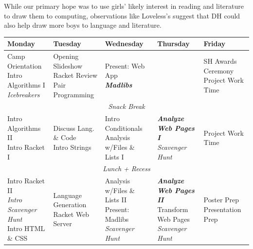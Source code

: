 While our primary hope was to use girls' likely interest in reading
and literature to draw them to computing, observations like Loveless's
suggest that DH could also help draw more boys to language and
literature.


\newcommand{\afk}[1]{\textit{#1}}
\newcommand{\proj}[1]{\textit{\textbf{#1}}}
\renewcommand\cellalign{lt}

\begin{table}[t]
\begin{tabular}{|l|l|l|l|l|}
\hline
\textbf{Monday} 	& \textbf{Tuesday} 	& \textbf{Wednesday} 	& \textbf{Thursday} 		& \textbf{Friday} \\ \hline \hline

\makecell{Camp Orientation \\ Intro Algorithms I \\ \afk{Icebreakers}}
	& \makecell{Opening Slideshow \\ Racket Review \\ Pair Programming} 
	& \makecell{Present: Web App \\ \proj{Madlibs}}
	& \makecell{RegExp}
	& \makecell{SH Awards Ceremony \\ Project Work Time}
	\\ \hline

\multicolumn{5}{|c|}{\afk{Snack Break}}
	\\ \hline

\makecell{Intro Algorithms II \\ Intro Racket I}
	& \makecell{Discuss Lang. \& Code \\ Intro Strings}
	& \makecell{Intro Conditionals \\ Analysis w/Files \& Lists I}
	& \makecell{\proj{Analyze Web Pages I} \\ \afk{Scavenger Hunt}}
	& Project Work Time
	\\ \hline

\multicolumn{5}{|c|}{\afk{Lunch + Recess}}
	\\ \hline

\makecell{Intro Racket II \\ \afk{Intro Scavenger Hunt} \\ Intro HTML \& CSS}
	& \makecell{Language Generation \\ Racket Web Server}
	& \makecell{Analysis w/Files \& Lists II \\ Present: Madlibs \\ \afk{Scavenger Hunt}}
	& \makecell{\proj{Analyze Web Pages II} \\ Transform Web Pages \\ \afk{Scavenger Hunt}}
	& \makecell{Poster Prep \\ Presentation Prep}
	\\ \hline


\end{tabular}
\end{table}
